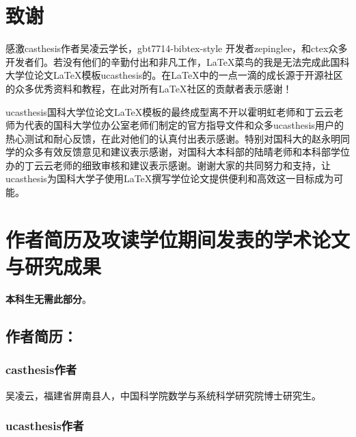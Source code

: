 \chapter[致谢]{致\quad 谢}%

感激casthesis作者吴凌云学长，gbt7714-bibtex-style
开发者zepinglee，和ctex众多开发者们。若没有他们的辛勤付出和非凡工作，\LaTeX{}菜鸟的我是无法完成此国科大学位论文\LaTeX{}模板ucasthesis的。在\LaTeX{}中的一点一滴的成长源于开源社区的众多优秀资料和教程，在此对所有\LaTeX{}社区的贡献者表示感谢！

ucasthesis国科大学位论文\LaTeX{}模板的最终成型离不开以霍明虹老师和丁云云老师为代表的国科大学位办公室老师们制定的官方指导文件和众多ucasthesis用户的热心测试和耐心反馈，在此对他们的认真付出表示感谢。特别对国科大的赵永明同学的众多有效反馈意见和建议表示感谢，对国科大本科部的陆晴老师和本科部学位办的丁云云老师的细致审核和建议表示感谢。谢谢大家的共同努力和支持，让ucasthesis为国科大学子使用\LaTeX{}撰写学位论文提供便利和高效这一目标成为可能。

\chapter{作者简历及攻读学位期间发表的学术论文与研究成果}

\textbf{本科生无需此部分}。

\section*{作者简历：}

\subsection*{casthesis作者}

吴凌云，福建省屏南县人，中国科学院数学与系统科学研究院博士研究生。

\subsection*{ucasthesis作者}

